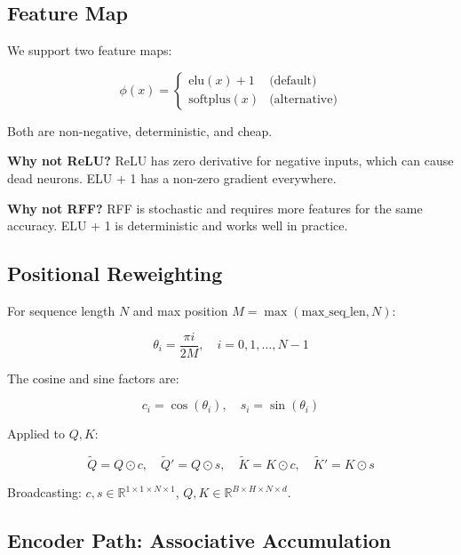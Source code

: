\subsection{Feature Map}

We support two feature maps:

\begin{equation}
\phi(x) = \begin{cases}
\text{elu}(x) + 1 & \text{(default)} \\
\text{softplus}(x) & \text{(alternative)}
\end{cases}
\end{equation}

Both are non-negative, deterministic, and cheap.

\textbf{Why not ReLU?} ReLU has zero derivative for negative inputs, which can 
cause dead neurons. ELU + 1 has a non-zero gradient everywhere.

\textbf{Why not RFF?} RFF is stochastic and requires more features for the same 
accuracy. ELU + 1 is deterministic and works well in practice.

\subsection{Positional Reweighting}

For sequence length $N$ and max position $M = \max(\text{max\_seq\_len}, N)$:

\begin{equation}
\theta_i = \frac{\pi i}{2 M}, \quad i = 0, 1, \dots, N-1
\end{equation}

The cosine and sine factors are:

\begin{equation}
c_i = \cos(\theta_i), \quad s_i = \sin(\theta_i)
\end{equation}

Applied to $Q, K$:

\begin{equation}
\tilde{Q} = Q \odot c, \quad \tilde{Q}' = Q \odot s, \quad
\tilde{K} = K \odot c, \quad \tilde{K}' = K \odot s
\end{equation}

Broadcasting: $c, s \in \mathbb{R}^{1 \times 1 \times N \times 1}$, 
$Q, K \in \mathbb{R}^{B \times H \times N \times d}$.

\subsection{Encoder Path: Associative Accumulation}

